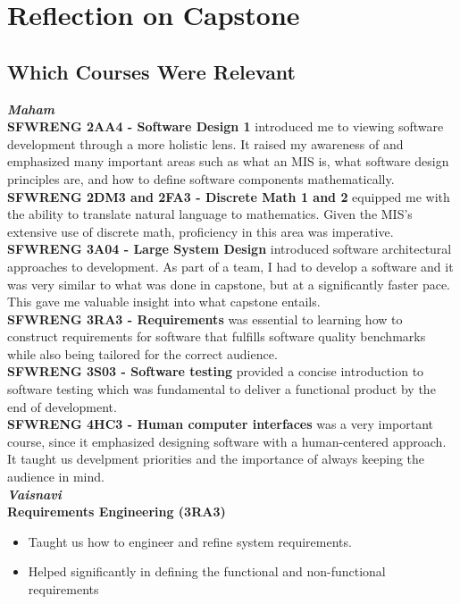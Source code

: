 \documentclass{article}
\begin{document}
\section{Reflection on Capstone}

\subsection{Which Courses Were Relevant}

\textit{\textbf{Maham}}\\
\textbf{SFWRENG 2AA4 - Software Design 1} introduced me to viewing software development through
a more holistic lens. It raised my awareness of and emphasized many important areas such as what
an MIS is, what software design principles are, and how to define software components mathematically.\\
\textbf{SFWRENG 2DM3 and 2FA3 - Discrete Math 1 and 2} equipped me with the ability to translate 
natural language to mathematics. Given the MIS's extensive use of discrete math, proficiency in this 
area was imperative. \\
\textbf{SFWRENG 3A04 - Large System Design} introduced software architectural approaches to development. 
As part of a team, I had to develop a software and it was very similar to what was done in 
capstone, but at a significantly faster pace. This gave me valuable insight 
into what capstone entails.\\
\textbf{SFWRENG 3RA3 - Requirements} was essential to learning how to construct requirements 
for software that fulfills software quality benchmarks while also being tailored for the correct audience. \\
\textbf{SFWRENG 3S03 - Software testing} provided a concise introduction to software testing which was
fundamental to deliver a functional product by the end of development. \\
\textbf{SFWRENG 4HC3 - Human computer interfaces} was a very important course, since it 
emphasized designing software with a human-centered approach. It taught us develpment priorities
and the importance of always keeping the audience in mind. \\
\newline
\textit{\textbf{Vaisnavi}}\\
\textbf{Requirements Engineering (3RA3)}
\begin{itemize}
    \item Taught us how to engineer and refine system requirements.
    \item Helped significantly in defining the functional and non-functional requirements
\end{itemize}
\end{document}
